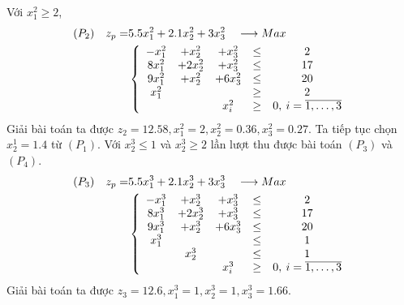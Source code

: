 \documentclass[12pt,a4paper]{report}
\begin{document}
    Với $x^2_1 \geq 2$, \\
    \begin{equation*}
      \begin{split}
        (P_2) \quad z_p= & 5.5x^2_1 + 2.1x^2_2 + 3x^2_3 \quad \longrightarrow Max \\
        & \left\{\begin{array} {ccccc}
         -x^2_1 &+ x^2_2 &+ x^2_3 &\leq &2 \\
         8x^2_1 &+ 2x^2_2 &+ x^2_3&\leq& 17 \\
         9x^2_1 &+ x^2_2 &+ 6x^2_3 &\leq &20 \\
         x^2_1 &&&\geq& 2 \\
        &&x^2_i &\geq &0 , \: i=\overline{\rm 1, \ldots ,3} \\
        \end{array}\right. \\
    \end{split}
    \end{equation*}
    Giải bài toán ta được $z_2=12.58, x^2_1=2, x^2_2=0.36, x^2_3=0.27$. Ta tiếp tục chọn $x^1_2=1.4$ từ $(P_1)$. Với $x^3_2 \leq 1$ và $x^3_2 \geq 2$ lần lượt thu được bài toán $(P_3)$ và $(P_4)$.
    \begin{equation*}
      \begin{split}
          (P_3) \quad z_p= & 5.5x^3_1 + 2.1x^3_2 + 3x^3_3 \quad \longrightarrow Max \\
          & \left\{\begin{array} {ccccc}
           -x^3_1 &+ x^3_2 &+ x^3_3 &\leq& 2 \\
           8x^3_1 &+ 2x^3_2 &+ x^3_3&\leq& 17 \\
           9x^3_1 &+ x^3_2 &+ 6x^3_3 &\leq& 20 \\
           x^3_1 &&&\leq &1 \\
           &x^3_2&& \leq &1 \\
          &&x^3_i &\geq& 0 , \: i=\overline{\rm 1, \ldots ,3} \\
          \end{array}\right. \\
      \end{split}
    \end{equation*}
    Giải bài toán ta được $z_3=12.6, x^3_1=1, x^3_2=1, x^3_3=1.66$.
\end{document}
